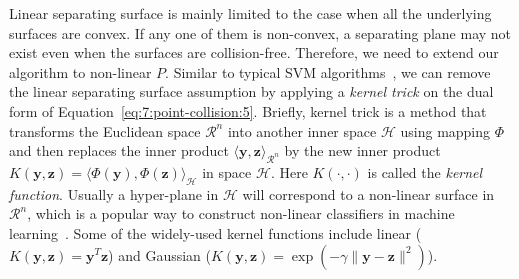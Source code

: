 Linear separating surface is mainly limited to the case when all the underlying surfaces are convex. If any one of them is non-convex, a separating plane may not exist even when
the surfaces are collision-free. Therefore, we need to extend our algorithm to non-linear $P$. Similar to typical SVM algorithms~\cite{Vapnik:1995:NSL}, we can remove the linear separating surface assumption by applying a {\em kernel trick} on the
dual form of Equation~\ref{eq:7:point-collision:5}. Briefly, kernel trick is a method that transforms the Euclidean space $\mathcal{R}^n$ into another
inner space $\mathcal{H}$ using mapping $\Phi$ and then replaces the inner product $\langle \mathbf y, \mathbf z \rangle_{\mathcal{R}^n}$ by the new inner product $K(\mathbf y, \mathbf z) = \langle \Phi(\mathbf y), \Phi(\mathbf z) \rangle_{\mathcal{H}}$ in space $\mathcal{H}$.
Here $K(\cdot, \cdot)$ is called the {\em kernel function}. Usually a hyper-plane in $\mathcal{H}$ will correspond to a non-linear surface in $\mathcal{R}^n$, which is a popular way to construct non-linear classifiers in machine learning~\cite{Hofmann:2008}. Some of the widely-used kernel functions include linear ($K(\mathbf y, \mathbf z) = \mathbf y^T \mathbf z$) and Gaussian ($K(\mathbf y, \mathbf z) = \exp(-\gamma \|\mathbf y - \mathbf z\|^2)$).

